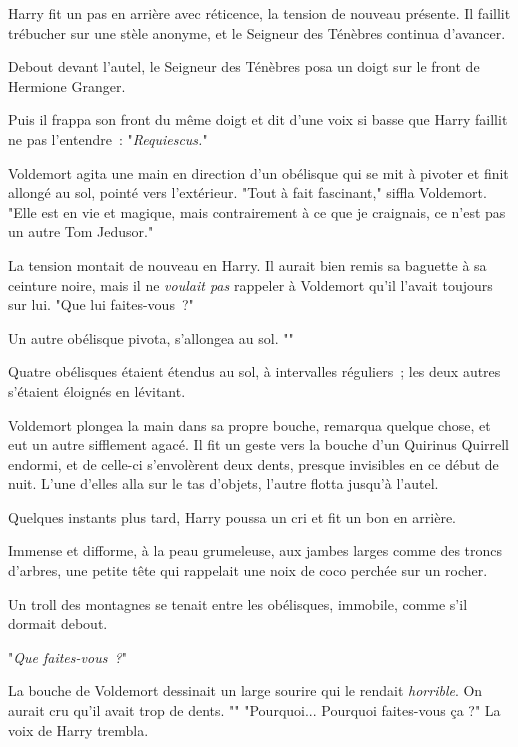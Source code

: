 Harry fit un pas en arrière avec réticence, la tension de nouveau présente. Il faillit trébucher sur une stèle anonyme, et le Seigneur des Ténèbres continua d'avancer.

Debout devant l'autel, le Seigneur des Ténèbres posa un doigt sur le front de Hermione Granger.

Puis il frappa son front du même doigt et dit d'une voix si basse que Harry faillit ne pas l'entendre~: "\emph{Requiescus.}"

Voldemort agita une main en direction d'un obélisque qui se mit à pivoter et finit allongé au sol, pointé vers l'extérieur. "Tout à fait fascinant," siffla Voldemort. "Elle est en vie et magique, mais contrairement à ce que je craignais, ce n'est pas un autre Tom Jedusor."

La tension montait de nouveau en Harry. Il aurait bien remis sa baguette à sa ceinture noire, mais il ne \emph{voulait pas} rappeler à Voldemort qu'il l'avait toujours sur lui. "Que lui faites-vous~?"

Un autre obélisque pivota, s'allongea au sol. ""

Quatre obélisques étaient étendus au sol, à intervalles réguliers~; les deux autres s'étaient éloignés en lévitant.

Voldemort plongea la main dans sa propre bouche, remarqua quelque chose, et eut un autre sifflement agacé. Il fit un geste vers la bouche d'un Quirinus Quirrell endormi, et de celle-ci s'envolèrent deux dents, presque invisibles en ce début de nuit. L'une d'elles alla sur le tas d'objets, l'autre flotta jusqu'à l'autel.

Quelques instants plus tard, Harry poussa un cri et fit un bon en arrière.

Immense et difforme, à la peau grumeleuse, aux jambes larges comme des troncs d'arbres, une petite tête qui rappelait une noix de coco perchée sur un rocher.

Un troll des montagnes se tenait entre les obélisques, immobile, comme s'il dormait debout.

"\emph{Que faites-vous~?}"

La bouche de Voldemort dessinait un large sourire qui le rendait \emph{horrible}. On aurait cru qu'il avait trop de dents. ""
"Pourquoi... Pourquoi faites-vous ça ?" La voix de Harry trembla.

